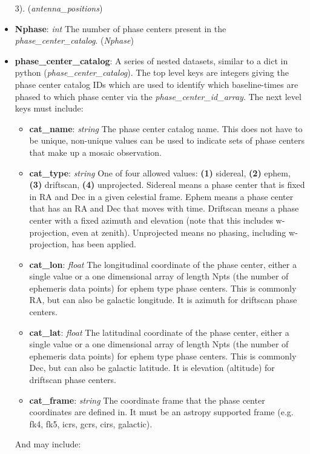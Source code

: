 \documentclass[11pt, oneside]{article}
\begin{document}
\begin{itemize}
  3). (\textit{antenna\_positions})
\item \textbf{Nphase}: \textit{int} The number of phase centers present in the
  \textit{phase\_center\_catalog}. (\textit{Nphase})
\item \textbf{phase\_center\_catalog}: A series of nested datasets, similar to
a dict in python (\textit{phase\_center\_catalog}). The top level keys are integers
giving the phase center catalog IDs which are used to identify which
baseline-times are phased to which phase center via the \textit{phase\_center\_id\_array}.
The next level keys must include:
	\begin{itemize}
	\item \textbf{cat\_name}: \textit{string} The phase center catalog name. This
	  does not have to be unique, non-unique values can be used to indicate sets
	  of phase centers that make up a mosaic observation.
	\item \textbf{cat\_type}: \textit{string} One of four allowed values:
	  \textbf{(1)} sidereal, \textbf{(2)} ephem, \textbf{(3)} driftscan,
	  \textbf{(4)} unprojected.
  	  Sidereal means a phase center that is fixed in RA and Dec in a given
	  celestial frame.
	  Ephem means a phase center that has an RA and Dec that
	  moves with time.
	  Driftscan means a phase center with a fixed azimuth and
	  elevation (note that this includes w-projection, even at zenith).
	  Unprojected means no phasing, including w-projection, has been applied.
  	\item \textbf{cat\_lon}: \textit{float} 
	  The longitudinal coordinate of the phase center, either a single value or a
	  one dimensional array of length Npts (the number of ephemeris data points)
	  for ephem type phase centers.
	  This is commonly RA, but can also be galactic longitude. It is azimuth for
	  driftscan phase centers.
  	\item \textbf{cat\_lat}: \textit{float}
	  The latitudinal coordinate of the phase center, either a single value or a
	  one dimensional array of length Npts (the number of ephemeris data points)
	  for ephem type phase centers.
	  This is commonly Dec, but can also be galactic latitude. It is elevation (altitude)
	  for driftscan phase centers.
	\item \textbf{cat\_frame}: \textit{string} The coordinate frame that the
	  phase center coordinates are defined in. It must be an astropy
	  supported frame (e.g. fk4, fk5, icrs, gcrs, cirs, galactic).
	\end{itemize}
And may include:
	\begin{itemize}

\end{itemize}
\end{itemize}
\end{document}
